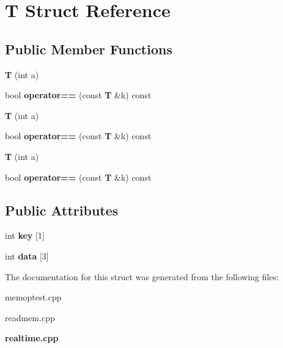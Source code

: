 \section{T Struct Reference}
\label{structT}
\subsection*{Public Member Functions}
\begin{DoxyCompactItemize}
\item 
{\bfseries T} (int a)\label{structT_a8f5edc9a39e3241d33ae54a5029b0043}

\item 
bool {\bfseries operator==} (const {\bf T} \&k) const \label{structT_aac67a90aee0b9034ea177ce4676052bf}

\item 
{\bfseries T} (int a)\label{structT_a8f5edc9a39e3241d33ae54a5029b0043}

\item 
bool {\bfseries operator==} (const {\bf T} \&k) const \label{structT_aac67a90aee0b9034ea177ce4676052bf}

\item 
{\bfseries T} (int a)\label{structT_a8f5edc9a39e3241d33ae54a5029b0043}

\item 
bool {\bfseries operator==} (const {\bf T} \&k) const \label{structT_aac67a90aee0b9034ea177ce4676052bf}

\end{DoxyCompactItemize}
\subsection*{Public Attributes}
\begin{DoxyCompactItemize}
\item 
int {\bfseries key} [1]\label{structT_a910785bad87bed60eccfe8fec17e55ec}

\item 
int {\bfseries data} [3]\label{structT_a07547b3bcc7ade309011aaa5a56ec814}

\end{DoxyCompactItemize}


The documentation for this struct was generated from the following files\+:\begin{DoxyCompactItemize}
\item 
memoptest.\+cpp\item 
readmem.\+cpp\item 
{\bf realtime.\+cpp}\end{DoxyCompactItemize}
